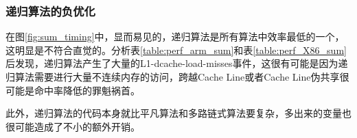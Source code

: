 \documentclass[a4paper]{article}
\begin{document}
\subsubsection{递归算法的负优化}
在图\ref{fig:sum_timing}中，显而易见的，递归算法是所有算法中效率最低的一个，这明显是不符合直觉的。分析表\ref{table:perf_arm_sum}和表\ref{table:perf_X86_sum}后发现，递归算法产生了大量的L1-dcache-load-misses事件，这很有可能是因为递归算法需要进行大量不连续内存的访问，跨越Cache Line或者Cache Line伪共享很可能是命中率降低的罪魁祸首。

此外，递归算法的代码本身就比平凡算法和多路链式算法要复杂，多出来的变量也很可能造成了不小的额外开销。

\newpage

 
\end{document}
